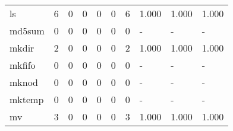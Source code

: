 \begin{longtable}{lp{1.3cm}p{1.3cm}p{1.3cm}p{1.3cm}p{1.3cm}p{1.3cm}p{1.3cm}p{1.3cm}p{1.3cm}}
ls        &                      6 &                                             0 &                                            0 &                                           0 &                                            0 &                                          6 &                                1.000 &                                  1.000 &                                1.000 \\
md5sum    &                      0 &                                             0 &                                            0 &                                           0 &                                            0 &                                          0 &                                    - &                                      - &                                    - \\
mkdir     &                      2 &                                             0 &                                            0 &                                           0 &                                            0 &                                          2 &                                1.000 &                                  1.000 &                                1.000 \\
mkfifo    &                      0 &                                             0 &                                            0 &                                           0 &                                            0 &                                          0 &                                    - &                                      - &                                    - \\
mknod     &                      0 &                                             0 &                                            0 &                                           0 &                                            0 &                                          0 &                                    - &                                      - &                                    - \\
mktemp    &                      0 &                                             0 &                                            0 &                                           0 &                                            0 &                                          0 &                                    - &                                      - &                                    - \\
mv        &                      3 &                                             0 &                                            0 &                                           0 &                                            0 &                                          3 &                                1.000 &                                  1.000 &                                1.000 \\

\end{longtable}

